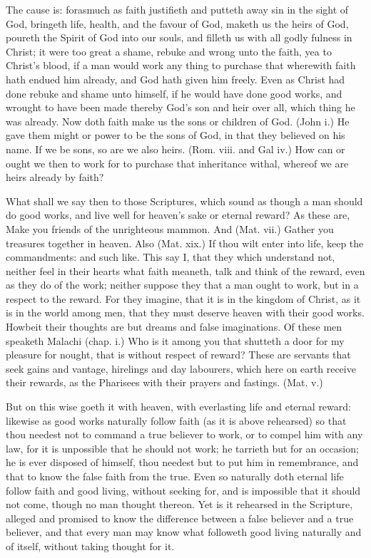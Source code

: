 The cause is: forasmuch as faith justifieth and putteth 
away sin in the sight of God, bringeth life, health, and the 
favour of God, maketh us the heirs of God, poureth the 
Spirit of God into our souls, and filleth us with all godly 
fulness in Christ; it were too great a shame, rebuke and 
wrong unto the faith, yea to Christ's blood, if a man would 
work any thing to purchase that wherewith faith hath endued
him already, and God hath given him freely. Even 
as Christ had done rebuke and shame unto himself, if he 
would have done good works, and wrought to have been 
made thereby God's son and heir over all, which thing he 
was already. Now doth faith make us the sons or children 
of God. (John i.) He gave them might or power to be 
the sons of God, in that they believed on his name. If 
we be sons, so are we also heirs. (Rom. viii. and Gal iv.) 
How can or ought we then to work for to purchase that 
inheritance withal, whereof we are heirs already by faith? 

What shall we say then to those Scriptures, which sound 
as though a man should do good works, and live well for 
heaven's sake or eternal reward? As these are, Make 
you friends of the unrighteous mammon. And (Mat. vii.) 
Gather you treasures together in heaven. Also (Mat. 
xix.) If thou wilt enter into life, keep the commandments: 
and such like. This say I, that they which understand 
not, neither feel in their hearts what faith meaneth, talk 
and think of the reward, even as they do of the work; 
neither suppose they that a man ought to work, but in a 
respect to the reward. For they imagine, that it is in the 
kingdom of Christ, as it is in the world among men, that 
they must deserve heaven with their good works. Howbeit 
their thoughts are but dreams and false imaginations. Of 
these men speaketh Malachi (chap. i.) Who is it among 
you that shutteth a door for my pleasure for nought, that is 
without respect of reward? These are servants that 
seek gains and vantage, hirelings and day labourers, which 
here on earth receive their rewards, as the Pharisees with 
their prayers and fastings. (Mat. v.) 

But on this wise goeth it with heaven, with everlasting 
life and eternal reward: likewise as good works naturally 
follow faith (as it is above rehearsed) so that thou needest 
not to command a true believer to work, or to compel him 
with any law, for it is unpossible that he should not work; 
he tarrieth but for an occasion; he is ever disposed of himself,
thou needest but to put him in remembrance, and 
that to know the false faith from the true. Even so naturally 
doth eternal life follow faith and good living, without seeking 
for, and is impossible that it should not come, though no 
man thought thereon. Yet is it rehearsed in the Scripture, 
alleged and promised to know the difference between a 
false believer and a true believer, and that every man may 
know what followeth good living naturally and of itself, 
without taking thought for it. 


